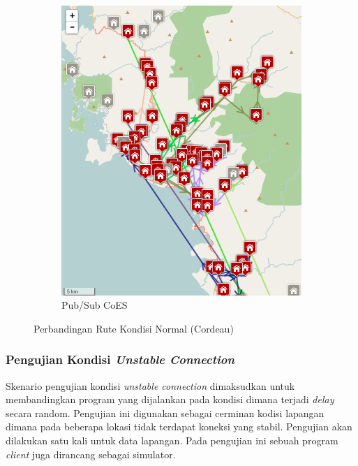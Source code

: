 \begin{figure}[!]
\begin{subfigure}[t]{0.5\textwidth}
		\includegraphics[width=\textwidth]{../../Resources/Images/test_result_normal_field_pubsub_coes}
		\caption{Pub/Sub CoES}
		\label{fig:test_result_normal_field_pubsub_coes}
    \end{subfigure}
    \caption{Perbandingan Rute Kondisi Normal (Cordeau)}
    \label{fig:test_result_normal_field_comparison}
\end{figure}


\subsubsection{Pengujian Kondisi \textit{Unstable Connection}}
Skenario pengujian kondisi \textit{unstable connection} dimaksudkan untuk membandingkan program yang dijalankan pada kondisi dimana terjadi \textit{delay} secara random. Pengujian ini digunakan sebagai cerminan kodisi lapangan dimana pada beberapa lokasi tidak terdapat koneksi yang stabil. Pengujian akan dilakukan satu kali untuk data lapangan. Pada pengujian ini sebuah program \textit{client} juga dirancang sebagai simulator.


